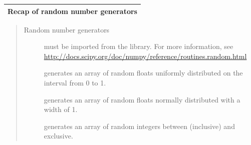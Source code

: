 \documentclass[letterpaper,10pt,english]{sphinxmanual}
\begin{document}
\begin{tabulary}{\linewidth}{|L|}
\hline

\textbf{Recap of random number generators}
\\\hline
\end{tabulary}

\begin{quote}
\begin{description}
\item[{Random number generators}] \leavevmode
must be imported from the  library.  For more information, see \href{http://docs.scipy.org/doc/numpy/reference/routines.random.html}{http://docs.scipy.org/doc/numpy/reference/routines.random.html}

\item[{}] \leavevmode
generates an array of  random floats uniformly distributed on the interval from 0 to 1.

\item[{}] \leavevmode
generates an array of  random floats normally distributed with a width of 1.

\item[{}] \leavevmode
generates an array of  random integers between  (inclusive) and  exclusive.

\end{description}
\end{quote}
\newpage
\end{document}
